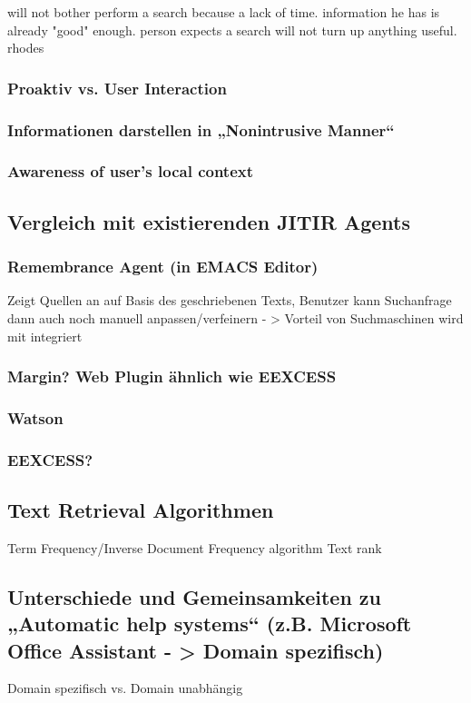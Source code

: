 will not bother perform a search because a lack of time. information he has is already "good" enough. person expects a search will not turn up anything useful. rhodes



 \subsubsection{Proaktiv vs. User Interaction}
 \subsubsection{Informationen darstellen in „Nonintrusive Manner“}
 \subsubsection{Awareness of user's local context}
\subsection{Vergleich mit existierenden JITIR Agents}
 	\subsubsection{Remembrance Agent (in EMACS Editor)}
		Zeigt Quellen an auf Basis des geschriebenen Texts, Benutzer kann Suchanfrage dann auch noch manuell anpassen/verfeinern
		- > Vorteil von Suchmaschinen wird mit integriert
 	\subsubsection{Margin? Web Plugin ähnlich wie EEXCESS}
 	\subsubsection{Watson}
 	\subsubsection{EEXCESS?}
 	\subsection{Text Retrieval Algorithmen}
 		Term Frequency/Inverse Document Frequency algorithm
 		Text rank
 \subsection{Unterschiede und Gemeinsamkeiten zu „Automatic help systems“ (z.B. Microsoft Office Assistant - > Domain spezifisch)}
 	Domain spezifisch vs. Domain unabhängig